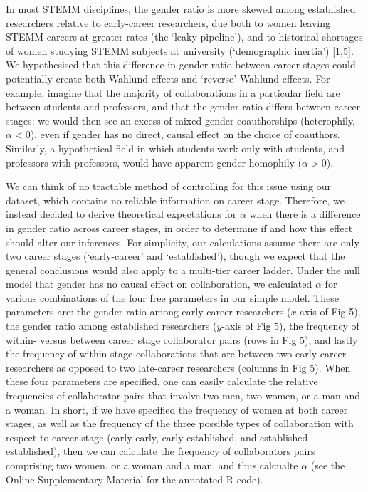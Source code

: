 \documentclass[12pt,]{article}
\begin{document}
In most STEMM disciplines, the gender ratio is more skewed among
established researchers relative to early-career researchers, due both
to women leaving STEMM careers at greater rates (the `leaky pipeline'),
and to historical shortages of women studying STEMM subjects at
university (`demographic inertia') {[}1,5{]}. We hypothesised that this
difference in gender ratio between career stages could potentially
create both Wahlund effects and `reverse' Wahlund effects. For example,
imagine that the majority of collaborations in a particular field are
between students and professors, and that the gender ratio differs
between career stages: we would then see an excess of mixed-gender
coauthorships (heterophily, \(\alpha < 0\)), even if gender has no
direct, causal effect on the choice of coauthors. Similarly, a
hypothetical field in which students work only with students, and
professors with professors, would have apparent gender homophily
(\(\alpha > 0\)).

We can think of no tractable method of controlling for this issue using
our dataset, which contains no reliable information on career stage.
Therefore, we instead decided to derive theoretical expectations for
\(\alpha\) when there is a difference in gender ratio across career
stages, in order to determine if and how this effect should alter our
inferences. For simplicity, our calculations assume there are only two
career stages (`early-career' and `established'), though we expect that
the general conclusions would also apply to a multi-tier career ladder.
Under the null model that gender has no causal effect on collaboration,
we calculated \(\alpha\) for various combinations of the four free
parameters in our simple model. These parameters are: the gender ratio
among early-career researchers (\(x\)-axis of Fig 5), the gender ratio
among established researchers (\(y\)-axis of Fig 5), the frequency of
within- versus between career stage collaborator pairs (rows in Fig 5),
and lastly the frequency of within-stage collaborations that are between
two early-career researchers as opposed to two late-career researchers
(columns in Fig 5). When these four parameters are specified, one can
easily calculate the relative frequencies of collaborator pairs that
involve two men, two women, or a man and a woman. In short, if we have
specified the frequency of women at both career stages, as well as the
frequency of the three possible types of collaboration with respect to
career stage (early-early, early-established, and
established-established), then we can calculate the frequency of
collaborators pairs comprising two women, or a woman and a man, and thus
calcualte \(\alpha\) (see the Online Supplementary Material for the
annotated R code).
\end{document}
